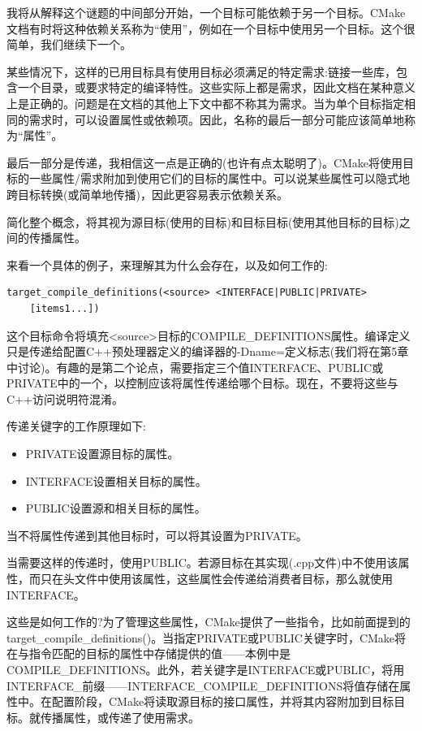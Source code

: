 我将从解释这个谜题的中间部分开始，一个目标可能依赖于另一个目标。CMake文档有时将这种依赖关系称为“使用”，例如在一个目标中使用另一个目标。这个很简单，我们继续下一个。

某些情况下，这样的已用目标具有使用目标必须满足的特定需求:链接一些库，包含一个目录，或要求特定的编译特性。这些实际上都是需求，因此文档在某种意义上是正确的。问题是在文档的其他上下文中都不称其为需求。当为单个目标指定相同的需求时，可以设置属性或依赖项。因此，名称的最后一部分可能应该简单地称为“属性”。

最后一部分是传递，我相信这一点是正确的(也许有点太聪明了)。CMake将使用目标的一些属性/需求附加到使用它们的目标的属性中。可以说某些属性可以隐式地跨目标转换(或简单地传播)，因此更容易表示依赖关系。

简化整个概念，将其视为源目标(使用的目标)和目标目标(使用其他目标的目标)之间的传播属性。

来看一个具体的例子，来理解其为什么会存在，以及如何工作的:

\begin{lstlisting}[style=styleCMake]
target_compile_definitions(<source> <INTERFACE|PUBLIC|PRIVATE> 
	[items1...])
\end{lstlisting}

这个目标命令将填充<source>目标的COMPILE\_DEFINITIONS属性。编译定义只是传递给配置C++预处理器定义的编译器的-Dname=定义标志(我们将在第5章中讨论)。有趣的是第二个论点，需要指定三个值INTERFACE、PUBLIC或PRIVATE中的一个，以控制应该将属性传递给哪个目标。现在，不要将这些与C++访问说明符混淆。

传递关键字的工作原理如下:

\begin{itemize}
\item 
PRIVATE设置源目标的属性。

\item 
INTERFACE设置相关目标的属性。

\item 
PUBLIC设置源和相关目标的属性。
\end{itemize}

当不将属性传递到其他目标时，可以将其设置为PRIVATE。

当需要这样的传递时，使用PUBLIC。若源目标在其实现(.cpp文件)中不使用该属性，而只在头文件中使用该属性，这些属性会传递给消费者目标，那么就使用INTERFACE。

这些是如何工作的?为了管理这些属性，CMake提供了一些指令，比如前面提到的target\_compile\_definitions()。当指定PRIVATE或PUBLIC关键字时，CMake将在与指令匹配的目标的属性中存储提供的值——本例中是COMPILE\_DEFINITIONS。此外，若关键字是INTERFACE或PUBLIC，将用INTERFACE\_前缀——INTERFACE\_COMPILE\_DEFINITIONS将值存储在属性中。在配置阶段，CMake将读取源目标的接口属性，并将其内容附加到目标目标。就传播属性，或传递了使用需求。

